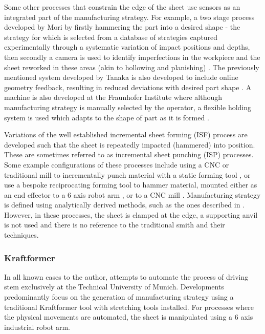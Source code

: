 Some other processes that constrain the edge of the sheet use sensors as an integrated part of the manufacturing strategy.  For example, a two stage process developed by Mori by firstly hammering the part into a desired shape -  the strategy for which is selected from a database of strategies captured experimentally through a systematic variation of impact positions and depths, then secondly a camera is used to identify imperfections in the workpiece and the sheet reworked in these areas (akin to hollowing and planishing) \citep{Mori1998IncrementalDatabase}. The previously mentioned system developed by Tanaka is also developed to include online geometry feedback, resulting  in reduced deviations with desired part shape \citep{Tanaka2014DevelopmentHammering}. A machine is also developed at the Fraunhofer Institute where although manufacturing strategy is manually selected by the operator, a flexible holding system is used which adapts to the shape of part as it is formed \citep{Sharon2014FraunhoferReport}.

Variations of the well established incremental sheet forming (ISF) process are developed such that the sheet is repeatedly impacted (hammered) into position. These are sometimes referred to as incremental sheet punching (ISP) processes. Some example configurations of these processes include using a CNC or traditional mill to incrementally punch material with a static forming tool \citep{Wang2017IncrementalPath,Zhu2019ToolForming}, or use a bespoke reciprocating forming tool to hammer material, mounted either as an end effector to a 6 axis robot arm \citep{Schafer2005IncrementalRobots, Puzik2008IncrementalApplication, Luo2010AResults}, or to a CNC mill \citep{Asgari2017DesignDamper}. Manufacturing strategy is defined using analytically derived methods, such as the ones described in \citep{Schafer2005IncrementalRobots,Wang2017IncrementalPath,Zhu2019ToolForming,Luo2010ASimulation}. However, in these processes, the sheet is clamped at the edge, a supporting anvil is not used and there is no reference to the traditional smith and their techniques.
 

\subsubsection*{Kraftformer} \label{sec:MechKraftformer}
In all known cases to the author, attempts to automate the process of driving stem exclusively at the Technical University of Munich. Developments predominantly focus on the  generation of manufacturing strategy using a traditional Kraftformer tool with stretching tools installed. For processes where the physical movements are automated, the sheet is manipulated using a 6 axis industrial robot arm. 

